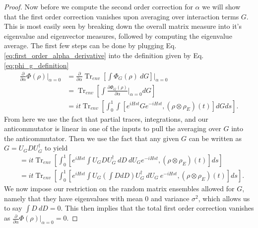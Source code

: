 \documentclass{article}
\newcommand{\parens}[1]{\left( #1 \right)}
\newcommand{\brackets}[1]{\left[ #1 \right]}
\DeclareMathOperator{\Tr}{Tr}
\newcommand{\partrace}[2]{\Tr_{#1} \brackets{ #2 }}
\begin{document}
\begin{proof}
Now before we compute the second order correction for $\alpha$ we will show that the first order correction vanishes upon averaging over interaction terms $G$. This is most easily seen by breaking down the overall matrix measure into it's eigenvalue and eigenvector measures, followed by computing the eigenvalue average. The first few steps can be done by plugging Eq. \eqref{eq:first_order_alpha_derivative} into the definition given by Eq. \eqref{eq:phi_g_definition}
\begin{align}
    \frac{\partial}{\partial \alpha} \Phi(\rho) \bigg|_{\alpha = 0} &= \frac{\partial}{\partial \alpha} \partrace{env}{\int \Phi_G(\rho) ~dG} \bigg|_{\alpha=0} \\
    &= \partrace{env}{\int\frac{\partial \Phi_G(\rho)}{\partial \alpha} \bigg|_{\alpha=0} dG } \\
    &= i t \partrace{env}{\int_0^1 \int [e^{i H s t} G e^{-i H s t}, \parens{\rho \otimes \rho_E}(t)] dG ds}.
\end{align}
From here we use the fact that partial traces, integrations, and our anticommutator is linear in one of the inputs to pull the averaging over $G$ into the anticommutator. Then we use the fact that any given $G$ can be written as $G = U_G D U_G^\dagger$ to yield
\begin{align}
    &= i t \partrace{env}{\int_0^1  [e^{i H s t} \int U_G D U_G^\dagger ~ dD ~ dU_G e^{-i H s t}, \parens{\rho \otimes \rho_E}(t)] ds} \\
    &= i t \partrace{env}{\int_0^1  [e^{i H s t} \int U_G \parens{\int D dD} U_G^\dagger ~ dU_G ~ e^{-i H s t}, \parens{\rho \otimes \rho_E}(t)] ds}.
\end{align}
We now impose our restriction on the random matrix ensembles allowed for $G$, namely that they have eigenvalues with mean $0$ and variance $\sigma^2$, which allows us to say $\int D ~dD = 0$. This then implies that the total first order correction vanishes as $\frac{\partial}{\partial \alpha} \Phi(\rho) \big|_{\alpha = 0} = 0$. 


\end{proof}
\end{document}
